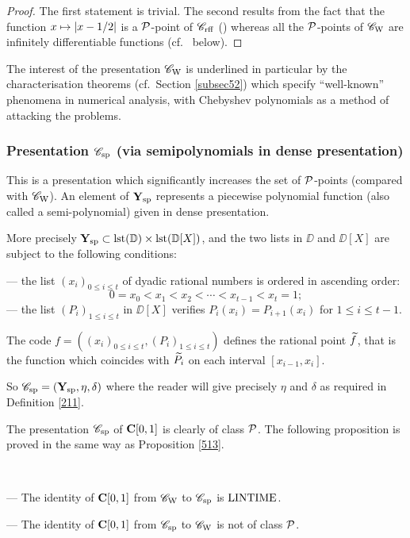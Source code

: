 %
\begin{proof}
The first statement is trivial. 
The second results from the fact that the function $x \mapsto \left|{x-1/2}\right|  $ is a ${\cal P}$-point of ${{{\mathscr C}}_{\rm rff}}$ () whereas all the ${\cal P}$-points of ${{{\mathscr C}}_{\rm W}}$ are infinitely differentiable functions (cf.\  below). 
\end{proof}
%


The interest of the presentation ${{{\mathscr C}}_{\rm W}}$ is underlined in particular by the characterisation theorems (cf.\ Section \ref{subsec52}) which specify  ``well-known''  phenomena in numerical analysis, with Chebyshev polynomials as a method of attacking the problems.



\subsubsection{Presentation \texorpdfstring{${{{\mathscr C}}_{\rm sp}}$}{Csp}
(via semipolynomials in dense presentation)}\label{subsubsec512}

This is a presentation which significantly increases the set of ${\cal P}$-points (compared with ${{{\mathscr C}}_{\rm W}}$). An element of ${{\bf Y}_{\rm sp}}$ represents a piecewise polynomial function (also called a semi-polynomial) given in dense presentation. 

More precisely ${{\bf Y}_{\rm sp}} \subset {\rm lst}(\mathbb {D}) \times {\rm lst}(\mathbb {D}[X])$, and the two lists in $\DD$ and $\DD[X]$ are subject to the following conditions:

\noindent 
--- the list $(x_i)_{0 \leq i \leq t}$ of dyadic rational numbers is ordered in ascending order: 
\[
0 = x_0 < x_1 < x_2 <\cdots< x_{t-1} < x_t =1;
\]
--- the list $(P_i)_{1 \leq i \leq t}$ in $\DD[X]$ verifies $P_i(x_i) = P_{i+1}(x_i)$ for $ 1 \leq i \leq t-1$.

\noindent 
The code $f = ((x_i)_{0 \leq i \leq t},(P_i)_{1 \leq i \leq t})$ defines the rational point $\widetilde{f}$, that is the function which coincides with  $\widetilde{P_i}$ on each interval $[x_{i-1},x_i]$. 

\smallskip So ${{{\mathscr C}}_{\rm sp}}=({{\bf Y}_{\rm sp}},\eta,\delta)$ where the reader will give precisely $\eta$ and $\delta$ as required in Definition \ref{211}.

\smallskip 
The presentation ${{{\mathscr C}}_{\rm sp}}$ of ${{\bf C}[0,1]}$ is clearly of class ${\cal P}$.
The following proposition is proved in the same way as Proposition \ref{513}.

\begin{proposition} \label{514} ~

\noindent 
--- The identity of ${{\bf C}[0,1]}$ from ${{{\mathscr C}}_{\rm W}}$ to ${{{\mathscr C}}_{\rm sp}}$ is ${\rm LINTIME}$.

\noindent 
--- The identity of ${{\bf C}[0,1]}$ from ${{{\mathscr C}}_{\rm sp}}$ to ${{{\mathscr C}}_{\rm W}}$ is not of class ${\cal P}$.
\end{proposition} 

